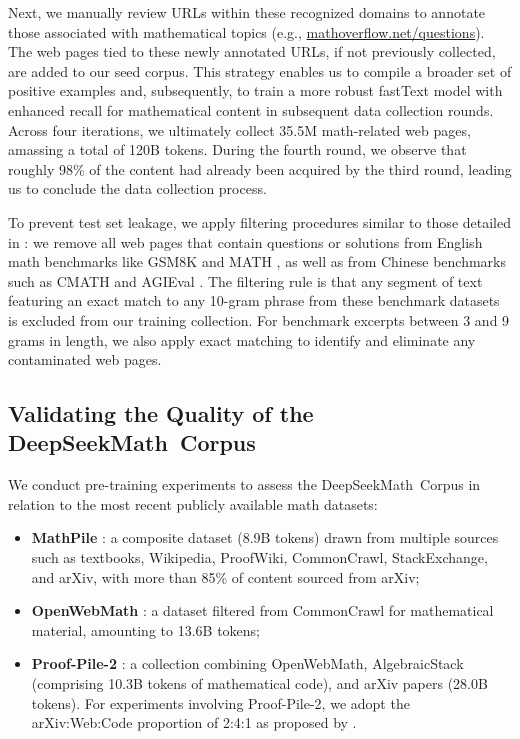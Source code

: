\begin{itemize}[topsep=0pt]
Next, we manually review URLs within these recognized domains to annotate those associated with mathematical topics (e.g., \url{mathoverflow.net/questions}). The web pages tied to these newly annotated URLs, if not previously collected, are added to our seed corpus. This strategy enables us to compile a broader set of positive examples and, subsequently, to train a more robust fastText model with enhanced recall for mathematical content in subsequent data collection rounds. Across four iterations, we ultimately collect 35.5M math-related web pages, amassing a total of 120B tokens. During the fourth round, we observe that roughly 98\% of the content had already been acquired by the third round, leading us to conclude the data collection process.

To prevent test set leakage, we apply filtering procedures similar to those detailed in \cite{deepseek-coder}: we remove all web pages that contain questions or solutions from English math benchmarks like GSM8K \citep{gsm8k} and MATH \citep{MATH}, as well as from Chinese benchmarks such as CMATH \citep{wei2023cmath} and AGIEval \citep{agieval}. The filtering rule is that any segment of text featuring an exact match to any 10-gram phrase from these benchmark datasets is excluded from our training collection. For benchmark excerpts between 3 and 9 grams in length, we also apply exact matching to identify and eliminate any contaminated web pages.

\subsection{Validating the Quality of the DeepSeekMath~Corpus}

We conduct pre-training experiments to assess the DeepSeekMath~Corpus in relation to the most recent publicly available math datasets:

\begin{itemize}[topsep=0pt]
    \item \textbf{MathPile} \citep{mathpile}: a composite dataset (8.9B tokens) drawn from multiple sources such as textbooks, Wikipedia, ProofWiki, CommonCrawl, StackExchange, and arXiv, with more than 85\% of content sourced from arXiv;
    \item \textbf{OpenWebMath} \citep{openwebmath}: a dataset filtered from CommonCrawl for mathematical material, amounting to 13.6B tokens;
    \item \textbf{Proof-Pile-2} \citep{llemma}: a collection combining OpenWebMath, AlgebraicStack (comprising 10.3B tokens of mathematical code), and arXiv papers (28.0B tokens). For experiments involving Proof-Pile-2, we adopt the arXiv:Web:Code proportion of 2:4:1 as proposed by \cite{llemma}.
\end{itemize}


\end{itemize}
